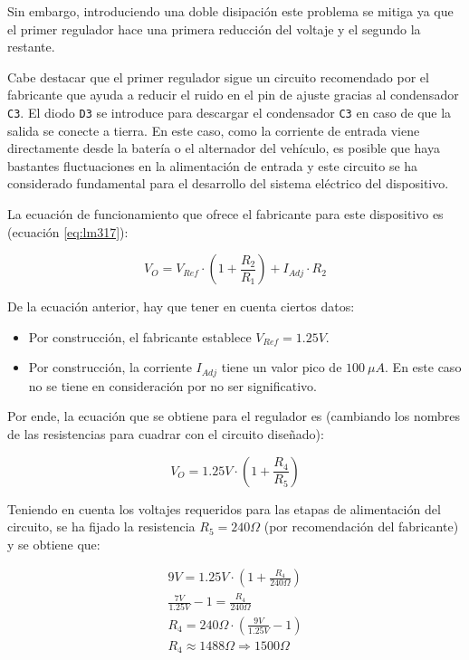 Sin embargo, introduciendo una doble disipación este problema se mitiga ya que el
primer regulador hace una primera reducción del voltaje y el segundo la restante.

Cabe destacar que el primer regulador sigue un circuito recomendado por el fabricante
que ayuda a reducir el ruido en el pin de ajuste gracias al condensador \texttt{C3}.
El diodo \texttt{D3} se introduce para descargar el condensador \texttt{C3} en caso de
que la salida se conecte a tierra. En este caso, como la corriente de entrada viene
directamente desde la batería o el alternador del vehículo, es posible que haya
bastantes fluctuaciones en la alimentación de entrada y este circuito se ha considerado
fundamental para el desarrollo del sistema eléctrico del dispositivo.

La ecuación de funcionamiento que ofrece el fabricante para este dispositivo es
(ecuación \ref{eq:lm317}):

\begin{equation}\label{eq:lm317}
  V_O = V_{Ref} \cdot \left(1 + \frac{R_2}{R_1}\right) + I_{Adj} \cdot R_2
\end{equation}

De la ecuación anterior, hay que tener en cuenta ciertos datos:

\begin{itemize}
  \item Por construcción, el fabricante establece $V_{Ref} = 1.25V$.
  \item Por construcción, la corriente $I_{Adj}$ tiene un valor pico de $100~\mu A$.
        En este caso no se tiene en consideración por no ser significativo.
\end{itemize}

Por ende, la ecuación que se obtiene para el regulador es (cambiando los nombres de
las resistencias para cuadrar con el circuito diseñado):

\begin{equation*}
  V_O = 1.25V \cdot \left(1 + \frac{R_4}{R_5}\right)
\end{equation*}

Teniendo en cuenta los voltajes requeridos para las etapas de alimentación del
circuito, se ha fijado la resistencia $R_5 = 240\Omega$ (por recomendación del
fabricante) y se obtiene que:

\begin{gather*}
  9V = 1.25V \cdot \left(1 + \frac{R_4}{240\Omega}\right) \\
  \frac{7V}{1.25V} - 1 = \frac{R_4}{240\Omega} \\
  R_4 = 240\Omega \cdot \left(\frac{9V}{1.25V} - 1\right) \\
  R_4 \approx 1488\Omega \Longrightarrow 1500\Omega
\end{gather*}

